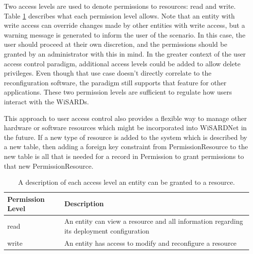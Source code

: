 Two access levels are used to denote permissions to resources: read and write. Table \ref{tab:permissions} describes what each permission level allows. Note that an entity with write access can override changes made by other entities with write access, but a warning message is generated to inform the user of the scenario. In this case, the user should proceed at their own discretion, and the permissions should be granted by an administrator with this in mind. In the greater context of the user access control paradigm, additional access levels could be added to allow delete privileges. Even though that use case doesn't directly correlate to the reconfiguration software, the paradigm still supports that feature for other applications. These two permission levels are sufficient to regulate how users  interact with the WiSARDs. 

This approach to user access control also provides a flexible way to manage other hardware or software resources which might be incorporated into WiSARDNet in the future. If a new type of resource is added to the system which is described by a new table, then adding a foreign key constraint from PermissionResource to the new table is all that is needed for a record in Permission to grant permissions to that new PermissionResource.\\


\begin{table}[H]
	\centering
	\renewcommand{\arraystretch}{1.1}
	\begin{tabular}{|p{3cm}|p{11cm}|}
	\hline
	Permission Level & Description\\
	\hline
	read & An entity can view a resource and all information regarding its deployment configuration \\
	\hline
	write & An entity has access to  modify and reconfigure a resource\\
	\hline
	\end{tabular}
	\caption{A description of each access level an entity can be granted to a resource.}
	\label{tab:permissions}
\end{table}

